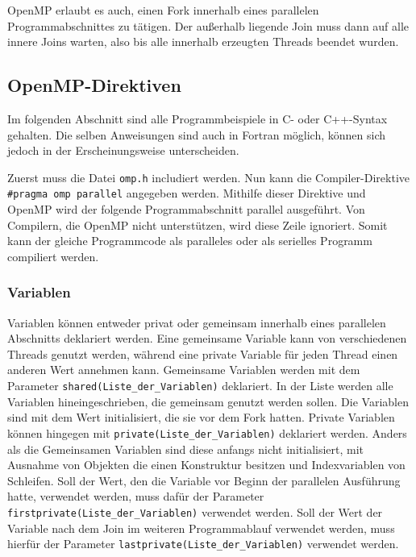 \documentclass[../main.tex]{subfiles}
\begin{document}
OpenMP erlaubt es auch, einen Fork innerhalb eines parallelen Programmabschnittes zu tätigen. Der außerhalb liegende Join muss dann auf alle innere Joins warten, also bis alle innerhalb erzeugten Threads beendet wurden.

\subsection{OpenMP-Direktiven}

Im folgenden Abschnitt sind alle Programmbeispiele in C- oder C++-Syntax gehalten. Die selben Anweisungen sind auch in Fortran möglich, können sich jedoch in der Erscheinungsweise unterscheiden.

Zuerst muss die Datei \texttt{omp.h} includiert werden. Nun kann die Compiler-Direktive \texttt{\#pragma\ omp\ parallel} angegeben werden. Mithilfe dieser Direktive und OpenMP wird der folgende Programmabschnitt parallel ausgeführt. Von Compilern, die OpenMP nicht unterstützen, wird diese Zeile ignoriert. Somit kann der gleiche Programmcode als paralleles oder als serielles Programm compiliert werden.

\subsubsection{Variablen}

Variablen können entweder privat oder gemeinsam innerhalb eines parallelen Abschnitts deklariert werden. Eine gemeinsame Variable kann von verschiedenen Threads genutzt werden, während eine private Variable für jeden Thread einen anderen Wert annehmen kann. Gemeinsame Variablen werden mit dem Parameter \texttt{shared(Liste\_der\_Variablen)} deklariert. In der Liste werden alle Variablen hineingeschrieben, die gemeinsam genutzt werden sollen. Die Variablen sind mit dem Wert initialisiert, die sie vor dem Fork hatten. Private Variablen können hingegen mit \texttt{private(Liste\_der\_Variablen)} deklariert werden.  Anders als die Gemeinsamen Variablen sind diese anfangs nicht initialisiert, mit Ausnahme von Objekten die einen Konstruktur besitzen und Indexvariablen von Schleifen.
Soll der Wert, den die Variable vor Beginn der parallelen Ausführung hatte, verwendet werden, muss dafür der Parameter \texttt{firstprivate(Liste\_der\_Variablen)} verwendet werden. Soll der Wert der Variable nach dem Join im weiteren Programmablauf verwendet werden, muss hierfür der Parameter \texttt{lastprivate(Liste\_der\_Variablen)} verwendet werden.
\end{document}
